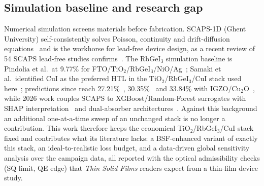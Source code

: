 \documentclass[review]{elsarticle}
\begin{document}
\subsection{Simulation baseline and research gap}
Numerical simulation screens materials before fabrication. SCAPS-1D (Ghent University) self-consistently solves Poisson, continuity and drift-diffusion equations~\cite{r19,r20,r21} and is the workhorse for lead-free device design, as a recent review of 54 SCAPS lead-free studies confirms~\cite{rReview}. The RbGeI$_{3}$ simulation baseline is Pindolia et al.\ at 9.77\% for FTO/TiO$_{2}$/RbGeI$_{3}$/NiO/Ag~\cite{r14}; Samaki et al.\ identified CuI as the preferred HTL in the TiO$_{2}$/RbGeI$_{3}$/CuI stack used here~\cite{r13}; predictions since reach 27.21\%~\cite{r22}, 30.35\%~\cite{rRahman} and 33.84\% with IGZO/Cu$_{2}$O~\cite{rReza}, while 2026 work couples SCAPS to XGBoost/Random-Forest surrogates with SHAP interpretation~\cite{rJCE,rMA,rML40} and dual-absorber architectures~\cite{rDual,rHasnain}. Against this background an additional one-at-a-time sweep of an unchanged stack is no longer a contribution. This work therefore keeps the economical TiO$_{2}$/RbGeI$_{3}$/CuI stack fixed and contributes what its literature lacks: a BSF-enhanced variant of exactly this stack, an ideal-to-realistic loss budget, and a data-driven global sensitivity analysis over the campaign data, all reported with the optical admissibility checks (SQ limit, QE edge) that \textit{Thin Solid Films} readers expect from a thin-film device study.
\end{document}
